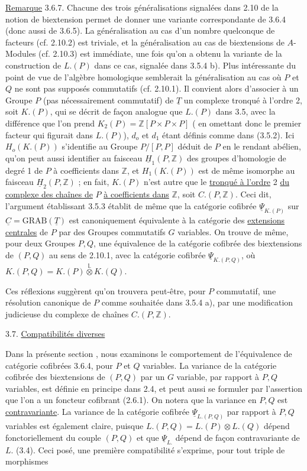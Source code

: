 \underline{Remarque} 3.6.7. Chacune des trois généralisations signalées dans 2.10 de la notion de biextension permet de donner une variante correspondante de 3.6.4 (donc aussi de 3.6.5). La généralisation au cas d'un nombre quelconque de facteurs (cf. 2.10.2) est triviale, et la généralisation au cas de biextensions de $A$-Modules (cf. 2.10.3) est immédiate, une fois qu'on a obtenu la variante de la construction de $L.(P)$ dans ce cas, signalée dans 3.5.4 b). Plus intéressante du point de vue de l'algèbre homologique semblerait la généralisation au cas où $P$ et $Q$ ne sont pas supposés commutatifs (cf. 2.10.1). Il convient alors d'associer à un Groupe $P$ (pas nécessairement commutatif) de $\underline{T}$ un complexe tronqué à l'ordre 2, soit $K.(P)$, qui se décrit de façon analogue que $L.(P)$ dans 3.5, avec la différence que l'on prend $K_2(P) = \mathbb{Z}[P \times P \times P]$ ( en omettant donc le premier facteur qui figurait dans $L.(P)$), $d_o$ et $d_1$ étant définis comme dans (3.5.2). Ici $H_o(K.(P))$ s'identifie au Groupe $P/[P,P]$ déduit de $P$ en le rendant abélien, qu'on peut aussi identifier au faisceau $\underline{H}_1(P,\mathbb{Z})$ des groupes d'homologie de degré 1 de $P$ à coefficients dans $\mathbb{Z}$, et $H_1(K.(P))$ est de même isomorphe au faisceau $\underline{H}_2(P,\mathbb{Z} )$ ; en fait, $K.(P)$ n'est autre que le \underline{tronqué à l'ordre} 2 \underline{du complexe des chaînes de} $P$ \underline{à coefficients dans} $\mathbb{Z}$, soit $C.(P,\mathbb{Z} )$. Ceci dit, l'argument établissant 3.5.3 établit de même que la catégorie cofibrée $\underline{\Psi}_{K.(P)}$ sur $\underline{C} = \mathrm{GRAB}(\underline{T})$ est
canoniquement équivalente à la catégorie des \underline{extensions centrales} de $P$ par des Groupes commutatifs $G$ variables. On trouve de même, pour deux Groupes $P,Q$, une équivalence de la catégorie cofibrée des biextensions de $(P,Q)$ au sens de 2.10.1, avec la catégorie cofibrée $\underline{\Psi}_{K.(P,Q)}$, où $K.(P,Q) = K.(P) \overset{\mathbb{L}}{\otimes} K.(Q)$.

Ces réflexions suggèrent qu'on trouvera peut-être, pour $P$ commutatif, une résolution canonique de $P$ comme souhaitée dans 3.5.4 a), par une modification judicieuse du complexe de chaînes $C.(P,\mathbb{Z} )$.


3.7. \underline{Compatibilités diverses}

Dans la présente section , nous examinons le comportement de l'équivalence de catégorie cofibrées 3.6.4, pour $P$ et $Q$ variables. La variance de la catégorie cofibrée des biextensions de $(P,Q)$ par un $G$ variable, par rapport à $P,Q$ variables, est définie en principe dans 2.4, et peut aussi se formuler par l'assertion que l'on a un foncteur cofibrant (2.6.1). On notera que la variance en $P,Q$ est \underline{contravariante}. La variance de la catégorie cofibrée $\underline{\Psi}_{L.(P,Q)}$ par rapport à $P,Q$ variables est également claire, puisque $L.(P,Q) = L.(P) \otimes L.(Q)$ dépend fonctoriellement du couple $(P,Q)$ et que $\underline{\Psi}_{L.}$ dépend de façon contravariante de $L.$ (3.4). Ceci posé, une première compatibilité s'exprime, pour tout triple de morphismes

